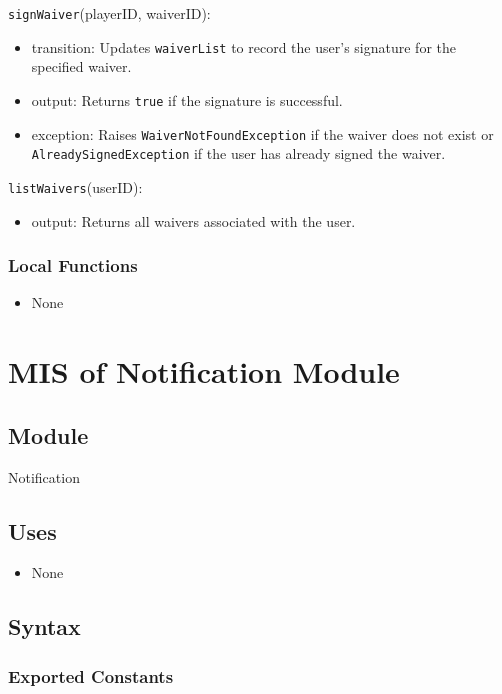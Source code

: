 \documentclass[12pt, titlepage]{article}
\begin{document}
\noindent \texttt{signWaiver}(playerID, waiverID):
\begin{itemize}
  \item transition: Updates \texttt{waiverList} to record the user's signature for the specified waiver.
  \item output: Returns \texttt{true} if the signature is successful.
  \item exception: Raises \texttt{WaiverNotFoundException} if the waiver does not exist or \texttt{AlreadySignedException} if the user has already signed the waiver.
\end{itemize}

\noindent \texttt{listWaivers}(userID):
\begin{itemize}
  \item output: Returns all waivers associated with the user.
\end{itemize}

\subsubsection{Local Functions}
\begin{itemize}
  \item None
\end{itemize}

\section{MIS of Notification Module} \label{Module:Notification}

\subsection{Module}

Notification

\subsection{Uses}

\begin{itemize}
  \item None
\end{itemize}

\subsection{Syntax}

\subsubsection{Exported Constants}
\end{document}
